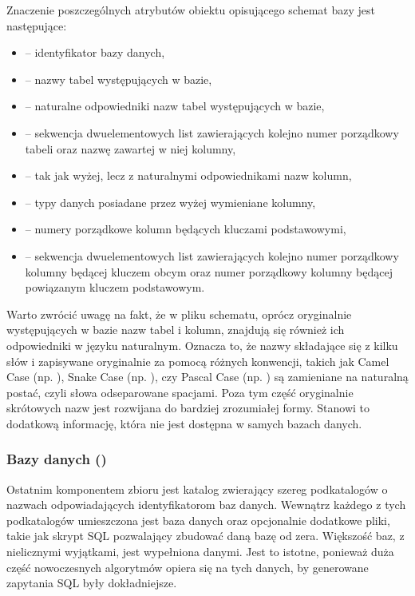 \begin{minipage}{\linewidth}

\end{minipage}

Znaczenie poszczególnych atrybutów obiektu opisującego schemat bazy jest następujące:\nobreakpar
\begin{itemize}
    \item \textbf{} -- identyfikator bazy danych,
    \item \textbf{} -- nazwy tabel występujących w bazie,
    \item \textbf{} -- naturalne odpowiedniki nazw tabel występujących w bazie,
    \item \textbf{} -- sekwencja dwuelementowych list zawierających kolejno numer porządkowy tabeli oraz nazwę zawartej w niej kolumny,
    \item \textbf{} -- tak jak wyżej, lecz z naturalnymi odpowiednikami nazw kolumn,
    \item \textbf{} -- typy danych posiadane przez wyżej wymieniane kolumny,
    \item \textbf{} -- numery porządkowe kolumn będących kluczami podstawowymi,
    \item \textbf{} -- sekwencja dwuelementowych list zawierających kolejno numer porządkowy kolumny będącej kluczem obcym oraz numer porządkowy kolumny będącej powiązanym kluczem podstawowym.
\end{itemize}

Warto zwrócić uwagę na fakt, że w pliku schematu, oprócz oryginalnie występujących w bazie nazw tabel i kolumn, znajdują się również ich odpowiedniki w języku naturalnym. Oznacza to, że nazwy składające się z kilku słów i zapisywane oryginalnie za pomocą różnych konwencji, takich jak Camel Case (np. ), Snake Case (np. ), czy Pascal Case (np. ) są zamieniane na naturalną postać, czyli słowa odseparowane spacjami. Poza tym część oryginalnie skrótowych nazw jest rozwijana do bardziej zrozumiałej formy. Stanowi to dodatkową informację, która nie jest dostępna w samych bazach danych.

\subsubsection{Bazy danych ()}
Ostatnim komponentem zbioru  jest katalog  zwierający szereg podkatalogów o nazwach odpowiadających identyfikatorom baz danych. Wewnątrz każdego z tych podkatalogów umieszczona jest baza danych  oraz opcjonalnie dodatkowe pliki, takie jak skrypt SQL pozwalający zbudować daną bazę od zera. Większość baz, z nielicznymi wyjątkami, jest wypełniona danymi. Jest to istotne, ponieważ duża część nowoczesnych algorytmów opiera się na tych danych, by generowane zapytania SQL były dokładniejsze.

